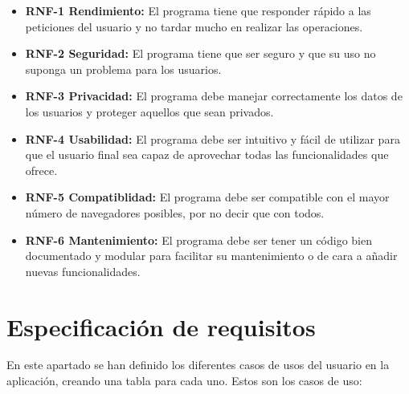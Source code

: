\begin{itemize}

	\item \textbf{RNF-1 Rendimiento:} El programa tiene que responder rápido a las peticiones del usuario y no tardar mucho en realizar las operaciones.
  
	\item \textbf{RNF-2 Seguridad:} El programa tiene que ser seguro y que su uso no suponga un problema para los usuarios.

     
	\item \textbf{RNF-3 Privacidad:} El programa debe manejar correctamente los datos de los usuarios y proteger aquellos que sean privados.
     
	\item \textbf{RNF-4 Usabilidad:} El programa debe ser intuitivo y fácil de utilizar para que el usuario final sea capaz de aprovechar todas las funcionalidades que ofrece.
 
	\item \textbf{RNF-5 Compatiblidad:} El programa debe ser compatible con el mayor número de navegadores posibles, por no decir que con todos.

 	\item \textbf{RNF-6 Mantenimiento:} El programa debe ser tener un código bien documentado y modular para facilitar su mantenimiento o de cara a añadir nuevas funcionalidades.

     
\end{itemize}

\section{Especificación de requisitos}
En este apartado se han definido los diferentes casos de usos del usuario en la aplicación, creando una tabla para cada uno. Estos son los casos de uso:

